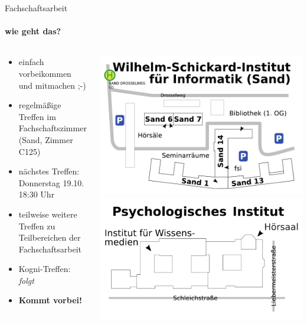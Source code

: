 \documentclass{beamer}
\begin{document}
	\begin{frame}{Fachschaftsarbeit}
		\framesubtitle{wie geht das?}
		\begin{columns}
			\begin{column}{.5\linewidth}
				\begin{itemize}
					\item einfach vorbeikommen und mitmachen ;-)
					\item regelmäßige Treffen im Fachschaftszimmer (Sand, Zimmer C125)
					\item nächstes Treffen: \\Donnerstag 19.10. 18:30 Uhr
					\item teilweise weitere Treffen zu Teilbereichen der Fachschaftsarbeit
					\item Kogni-Treffen: \emph{folgt}
					\item \textbf{Kommt vorbei!}
				\end{itemize}
			\end{column}
			\begin{column}{0.5\linewidth}
				\includegraphics[width=\linewidth]{pictures/uebersicht_sand.pdf}\\
				\includegraphics[width=\linewidth]{pictures/uebersicht_pi.pdf}\\
			\end{column}
		\end{columns}
	\end{frame}
	
\end{document}

